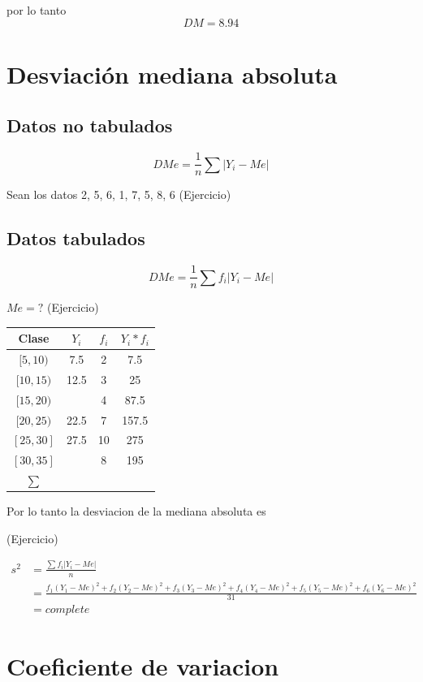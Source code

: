 \documentclass[10pt,]{krantz}
\theoremstyle{definition}
\theoremstyle{definition}
\theoremstyle{definition}
\theoremstyle{definition}
\theoremstyle{remark}
\begin{document}
por lo tanto \[DM=8.94\]

\hypertarget{desviaciuxf3n-mediana-absoluta}{%
\section{Desviación mediana absoluta}\label{desviaciuxf3n-mediana-absoluta}}

\hypertarget{datos-no-tabulados-2}{%
\subsection{Datos no tabulados}\label{datos-no-tabulados-2}}

\[DMe=\frac{1}{n}\sum \left\vert Y_i-Me\right\vert\]

Sean los datos 2, 5, 6, 1, 7, 5, 8, 6 (Ejercicio)

\hypertarget{datos-tabulados-2}{%
\subsection{Datos tabulados}\label{datos-tabulados-2}}

\[DMe=\frac{1}{n}\sum f_i \left \vert Y_i-Me\right\vert\]

\(Me=?\) (Ejercicio)

\begin{longtable}[]{@{}cccc@{}}
\toprule
Clase & \(Y_i\) & \(f_i\) & \(Y_i*f_i\)\tabularnewline
\midrule
\endhead
\([5,10)\) & 7.5 & 2 & 7.5\tabularnewline
\([10,15)\) & 12.5 & 3 & 25\tabularnewline
\([15,20)\) & & 4 & 87.5\tabularnewline
\([20,25)\) & 22.5 & 7 & 157.5\tabularnewline
\([25,30]\) & 27.5 & 10 & 275\tabularnewline
\([30,35]\) & & 8 & 195\tabularnewline
\(\sum\) & & &\tabularnewline
\bottomrule
\end{longtable}

Por lo tanto la desviacion de la mediana absoluta es

(Ejercicio)

\[
\begin{aligned}
s^2&=\frac{\sum f_i\left \vert Y_i-Me\right \vert}{n}\\
&=\frac{f_1\left(Y_1-Me\right )^2+f_2\left(Y_2-Me\right )^2+f_3\left(Y_3-Me\right )^2+f_4\left(Y_4-Me\right )^2+f_5\left(Y_5-Me\right )^2+f_6\left(Y_6-Me\right )^2}{31}\\
&=complete
\end{aligned}
\]

\hypertarget{coeficiente-de-variacion}{%
\section{Coeficiente de variacion}\label{coeficiente-de-variacion}}
\end{document}
